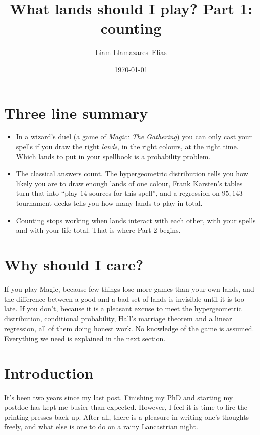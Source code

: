 \documentclass[
    a4paper,
    DIV=13,
    abstract=true,
    numbers=noenddot
]{scrartcl}
\begin{document}
\title{What lands should I play? Part 1: counting}
\author{Liam Llamazares--Elias}
\date{\today}
\maketitle

\section{Three line summary}
\begin{itemize}
  \item In a wizard's duel (a game of \emph{Magic: The Gathering}) you can only cast your spells if you draw the right \emph{lands}, in the right colours, at the right time. Which lands to put in your spellbook is a probability problem.
  \item The classical answers count. The hypergeometric distribution tells you how likely you are to draw enough lands of one colour, Frank Karsten's tables turn that into ``play $14$ sources for this spell'', and a regression on $95{,}143$ tournament decks tells you how many lands to play in total.
  \item Counting stops working when lands interact with each other, with your spells and with your life total. That is where Part 2 begins.
\end{itemize}

\section{Why should I care?}
If you play Magic, because few things lose more games than your own lands, and the difference between a good and a bad set of lands is invisible until it is too late. If you don't, because it is a pleasant excuse to meet the hypergeometric distribution, conditional probability, Hall's marriage theorem and a linear regression, all of them doing honest work. No knowledge of the game is assumed. Everything we need is explained in the next section.

\section{Introduction}
It's been two years since my last post. Finishing my PhD and starting my postdoc has kept me busier than expected. However, I feel it is time to fire the printing presses back up. After all, there is a pleasure in writing one's thoughts freely, and what else is one to do on a rainy Lancastrian night.
\end{document}

